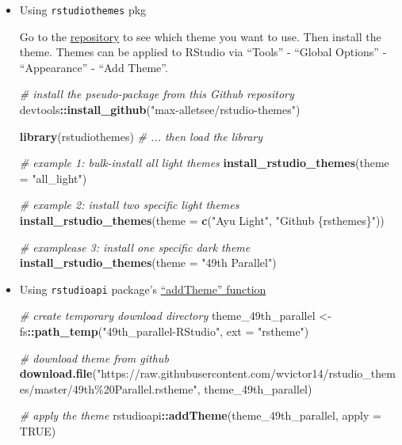 \documentclass[
  a4paper,
  twoside,
  openright]{book}
\newenvironment{Shaded}{\begin{snugshade}}{\end{snugshade}}
\newcommand{\AttributeTok}[1]{\textcolor[rgb]{0.13,0.29,0.53}{#1}}
\newcommand{\CommentTok}[1]{\textcolor[rgb]{0.56,0.35,0.01}{\textit{#1}}}
\newcommand{\ConstantTok}[1]{\textcolor[rgb]{0.56,0.35,0.01}{#1}}
\newcommand{\FunctionTok}[1]{\textcolor[rgb]{0.13,0.29,0.53}{\textbf{#1}}}
\newcommand{\NormalTok}[1]{#1}
\newcommand{\OtherTok}[1]{\textcolor[rgb]{0.56,0.35,0.01}{#1}}
\newcommand{\SpecialCharTok}[1]{\textcolor[rgb]{0.81,0.36,0.00}{\textbf{#1}}}
\newcommand{\StringTok}[1]{\textcolor[rgb]{0.31,0.60,0.02}{#1}}
\theoremstyle{definition}
\theoremstyle{definition}
\theoremstyle{definition}
\theoremstyle{definition}
\theoremstyle{remark}
\begin{document}
\begin{itemize}
\item
  Using \texttt{rstudiothemes} pkg

  Go to the \href{https://github.com/max-alletsee/rstudio-themes?tab=readme-ov-file}{repository} to see which theme you want to use. Then install the theme. Themes can be applied to RStudio via ``Tools'' - ``Global Options'' - ``Appearance'' - ``Add Theme''.

\begin{Shaded}
\begin{Highlighting}[]
\CommentTok{\# install the pseudo{-}package from this Github repository}
\NormalTok{devtools}\SpecialCharTok{::}\FunctionTok{install\_github}\NormalTok{(}\StringTok{"max{-}alletsee/rstudio{-}themes"}\NormalTok{)}

\FunctionTok{library}\NormalTok{(rstudiothemes) }\CommentTok{\# ... then load the library}

\CommentTok{\# example 1: bulk{-}install all light themes}
\FunctionTok{install\_rstudio\_themes}\NormalTok{(}\AttributeTok{theme =} \StringTok{"all\_light"}\NormalTok{)}

\CommentTok{\# example 2: install two specific light themes}
\FunctionTok{install\_rstudio\_themes}\NormalTok{(}\AttributeTok{theme =} \FunctionTok{c}\NormalTok{(}\StringTok{"Ayu Light"}\NormalTok{, }\StringTok{"Github \{rsthemes\}"}\NormalTok{))}

\CommentTok{\# examplease 3: install one specific dark theme}
\FunctionTok{install\_rstudio\_themes}\NormalTok{(}\AttributeTok{theme =} \StringTok{"49th Parallel"}\NormalTok{)}
\end{Highlighting}
\end{Shaded}
\item
  Using \texttt{rstudioapi} package's \href{https://rdrr.io/cran/rstudioapi/man/addTheme.html}{``addTheme'' function}

\begin{Shaded}
\begin{Highlighting}[]
\CommentTok{\# create temporary download directory}
\NormalTok{theme\_49th\_parallel }\OtherTok{\textless{}{-}}\NormalTok{ fs}\SpecialCharTok{::}\FunctionTok{path\_temp}\NormalTok{(}\StringTok{"49th\_parallel{-}RStudio"}\NormalTok{, }
                                     \AttributeTok{ext =} \StringTok{"rstheme"}\NormalTok{)}

\CommentTok{\# download theme from github}
\FunctionTok{download.file}\NormalTok{(}\StringTok{"https://raw.githubusercontent.com/wvictor14/rstudio\_themes/master/49th\%20Parallel.rstheme"}\NormalTok{, }
\NormalTok{              theme\_49th\_parallel)}

\CommentTok{\# apply the theme}
\NormalTok{rstudioapi}\SpecialCharTok{::}\FunctionTok{addTheme}\NormalTok{(theme\_49th\_parallel, }
                     \AttributeTok{apply =} \ConstantTok{TRUE}\NormalTok{)}
\end{Highlighting}
\end{Shaded}
\end{itemize}
\end{document}
